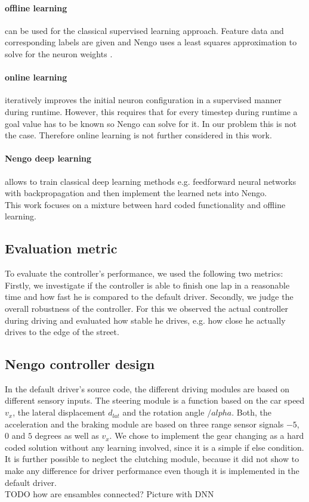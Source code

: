 \documentclass[10pt,a4paper,twoside,journal]{IEEEtran}
\begin{document}
\paragraph{offline learning} can be used for the classical supervised learning approach. Feature data and corresponding labels are given and Nengo uses a least squares approximation to solve for the neuron weights \cite{nef}.

\paragraph{online learning} iteratively improves the initial neuron configuration in a supervised manner during runtime. However, this requires that for every timestep during runtime a goal value has to be known so Nengo can solve for it. In our problem this is not the case. Therefore online learning is not further considered in this work.

\paragraph{Nengo deep learning} allows to train classical deep learning methods e.g. feedforward neural networks with backpropagation and then implement the learned nets into Nengo. \\
This work focuses on a mixture between hard coded functionality and offline learning.

\subsection{Evaluation metric}
To evaluate the controller's performance, we used the following two metrics: Firstly, we investigate if the controller is able to finish one lap in a reasonable time and how fast he is compared to the default driver. Secondly, we judge the overall robustness of the controller. For this we observed the actual controller during driving and evaluated how stable he drives, e.g. how close he actually drives to the edge of the street. 

\subsection{Nengo controller design}
In the default driver's source code, the different driving modules are based on different sensory inputs. The steering module is a function based on the car speed $v_x$, the lateral displacement $d_{lat}$ and the rotation angle $/alpha$. Both, the acceleration and the braking module are based on three range sensor signals $-5$, $0$ and $5$ degrees as well as $v_x$. We chose to implement the gear changing as a hard coded solution without any learning involved, since it is a simple if else condition. It is further possible to neglect the clutching module, because it did not show to make any difference for driver performance even though it is implemented in the default driver. \\
TODO how are ensambles connected? Picture with DNN
\end{document}
